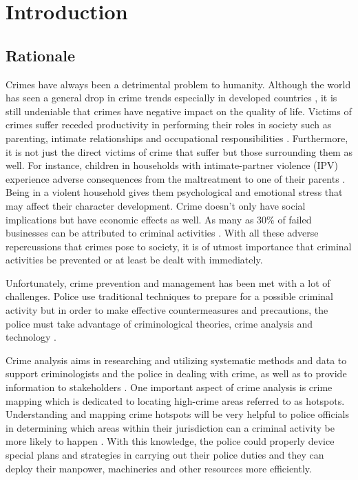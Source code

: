 
\chapter{Introduction}  %

\section{Rationale} %

    Crimes have always been a detrimental problem to humanity. Although the world has seen a general drop in crime trends especially in developed countries \citep{dijk2007criminal}, it is still undeniable that crimes have negative impact on the quality of life. Victims of crimes suffer receded productivity in performing their roles in society such as parenting, intimate relationships and occupational responsibilities \citep{hanson2010impact}. Furthermore, it is not just the direct victims of crime that suffer but those surrounding them as well. For instance, children in households with intimate-partner violence (IPV) experience adverse consequences from the maltreatment to one of their parents \citep{casanueva2008quality}. Being in a violent household gives them psychological and emotional stress that may affect their character development. Crime doesn’t only have social implications but have economic effects as well. As many as 30\% of failed businesses can be attributed to criminal activities \citep{bressler2009impact}. With all these adverse repercussions that crimes pose to society, it is of utmost importance that criminal activities be prevented or at least be dealt with immediately.

    Unfortunately, crime prevention and management has been met with a lot of challenges. Police use traditional techniques to prepare for a possible criminal activity but in order to make effective countermeasures and precautions, the police must take advantage of criminological theories, crime analysis and technology \citep{polat2007spatio}.

    Crime analysis aims in researching and utilizing systematic methods and data to support criminologists and the police in dealing with crime, as well as to provide information to stakeholders \citep{santos2012crime}. One important aspect of crime analysis is crime mapping which is dedicated to locating high-crime areas referred to as hotspots. Understanding and mapping crime hotspots will be very helpful to police officials in determining which areas within their jurisdiction can a criminal activity be more likely to happen \citep{eck2005mapping}. With this knowledge, the police could properly device special plans and strategies in carrying out their police duties and they can deploy their manpower, machineries and other resources more efficiently.

